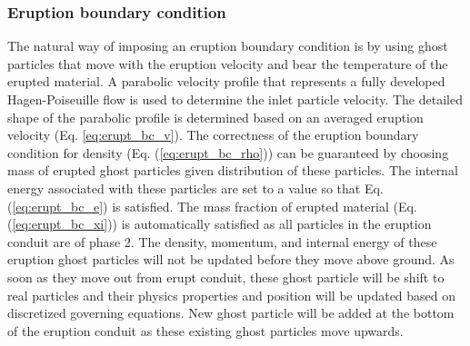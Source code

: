 \documentclass[journal abbreviation, manuscript]{copernicus}
\begin{document}
\subsubsection{Eruption boundary condition}
The natural way of imposing an eruption boundary condition is by using ghost particles that move with the eruption velocity and bear the temperature of the erupted material. A parabolic velocity profile that represents a fully developed Hagen-Poiseuille flow is used to determine the inlet particle velocity. The detailed shape of the parabolic profile is determined based on an averaged eruption velocity (Eq. \ref{eq:erupt_bc_v}). The correctness of the eruption boundary condition for density (Eq. (\ref{eq:erupt_bc_rho})) can be guaranteed by choosing mass of erupted ghost particles given distribution of these particles. The internal energy associated with these particles are set to a value so that Eq. (\ref{eq:erupt_bc_e}) is satisfied. The mass fraction of erupted material (Eq. (\ref{eq:erupt_bc_xi})) is automatically satisfied as all particles in the eruption conduit are of phase 2. The density, momentum, and internal energy of these eruption ghost particles will not be updated before they move above ground. As soon as they move out from erupt conduit, these ghost particle will be shift to real particles and their physics properties and position will be updated based on discretized governing equations. New ghost particle will be added at the bottom of the eruption conduit as these existing ghost particles move upwards.
\end{document}
